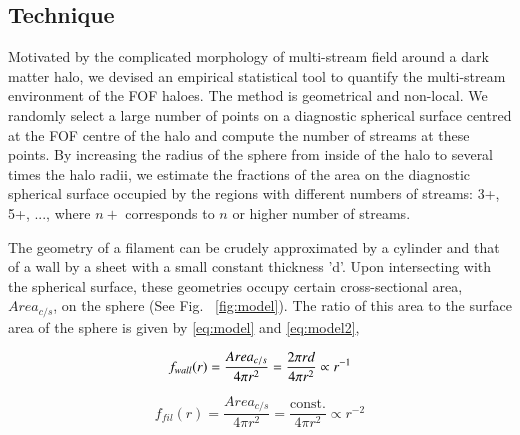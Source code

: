 \subsection{Technique}

Motivated by the complicated morphology of multi-stream field around a dark matter halo, we devised an empirical 
statistical tool to quantify the multi-stream environment of the FOF haloes. The method is geometrical and non-local.
We  randomly select a large number of points on a diagnostic spherical surface centred at the FOF centre of the halo 
and compute the number of streams  at these points. By increasing the radius of the sphere from inside of the halo to several times the halo radii, we estimate  the fractions of the area on the diagnostic spherical surface occupied by the regions with different numbers of streams:
3+, 5+, ..., where $n+$ corresponds to $n$ or higher number of streams. 

 
The geometry of a filament can be crudely approximated by a cylinder and that of a wall by a sheet with a small constant thickness 'd'. Upon intersecting with the spherical surface, these geometries occupy certain cross-sectional area, $Area_{c/s}$, on the sphere (See Fig. ~\ref{fig:model}). The ratio of this area to the surface area of the sphere  is given by \autoref{eq:model} and \autoref{eq:model2},



\begin{equation} \label{eq:model}
  f_{wall} (r) = \frac{Area_{c/s}}{4\pi r^2} = \frac{2\pi r d}{4\pi r^2} \propto r^{-1} \\
 \end{equation}

 
 
  \begin{equation} \label{eq:model2}
 f_{fil} (r) = \frac{Area_{c/s}}{4\pi r^2} = \frac{\text{const.}}{4\pi r^2} \propto r^{-2}
 \end{equation}

